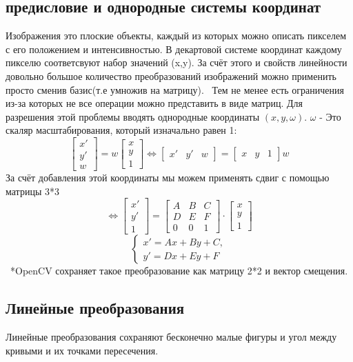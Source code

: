 \documentclass[a4paper,12pt]{article}
\begin{document}
\subsection{предисловие и однородные системы координат}
Изображения это плоские объекты, каждый из которых можно описать пикселем с его положением и интенсивностью. В декартовой системе координат каждому пикселю соответсвуют набор значений (x,y). За счёт этого и свойств линейности довольно большое количество преобразований изображений можно применить просто сменив базис(т.е умножив на матрицу).
\
Тем не менее есть ограничения из-за которых не все операции можно представить в виде матриц. Для разрешения этой проблемы вводять однородные координаты $(x,y,\omega )$. $\omega$ - Это скаляр масштабирования, который изначально равен 1:
$$
	\begin{bmatrix} x' \\ y' \\ w \end{bmatrix} = w
	\begin{bmatrix} x \\ y \\ 1 \end{bmatrix}
	\Leftrightarrow
	\begin{bmatrix} x' & y' & w \end{bmatrix} =
	\begin{bmatrix} x & y & 1 \end{bmatrix}w
$$
За счёт добавления этой координаты мы можем применять сдвиг с помощью матрицы 3*3
$$
	\Leftrightarrow
	\begin{bmatrix} x' \\ y' \\ 1 \end{bmatrix} =
	\begin{bmatrix}
		A & B & C
		\\ D & E & F
		\\ 0 & 0 & 1
	\end{bmatrix} \cdot
	\begin{bmatrix} x \\ y \\ 1 \end{bmatrix}
$$
$$
	\begin{cases}
		x'=Ax+By+C,
		\\ y'=Dx+Ey+F
	\end{cases}
$$
\
*OpenCV сохраняет такое преобразование как матрицу 2*2 и вектор смещения.
\subsection{Линейные преобразования}
Линейные преобразования сохраняют бесконечно малые фигуры и угол между кривыми и их точками пересечения.
\end{document}

